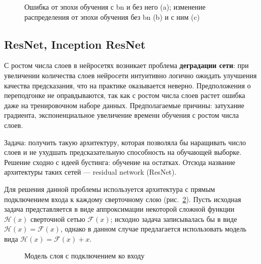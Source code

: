 \documentclass[12pt, specialist, subf, substylefile = spbu.rtx]{disser}
\begin{document}
\begin{figure}[h]
\caption{Ошибка от эпохи обучения с bn и без него (a); изменение распределения от эпохи обучения без bn (b) и с ним (c)}
\label{img:bn}
\end{figure}


\subsection{ResNet, Inception ResNet}

С ростом числа слоев в нейросетях возникает проблема \textbf{деградации сети}: при увеличении количества слоев нейросети интуитивно логично ожидать улучшения качества предсказания, что на практике оказывается неверно. Предположения о переподгонке не оправдываются, так как с ростом числа слоев растет ошибка даже на тренировочном наборе данных. Предполагаемые причины: затухание градиента, экспоненциальное увеличение времени обучения с ростом числа слоев.

Задача: получить такую архитектуру, которая позволяла бы наращивать число слоев и не ухудшать предсказательную способность на обучающей выборке. Решение сходно с идеей бустинга: обучение на остатках. Отсюда название архитектуры таких сетей --- residual network (ResNet).

Для решения данной проблемы используется архитектура с прямым подключением входа к каждому сверточному слою (рис.~\ref{img:resnet}). Пусть исходная задача представляется в виде аппроксимации некоторой сложной функции $\mathcal{H}(x)$ сверточной сетью $\mathcal{F}(x)$; исходно задача записывалась бы в виде $\mathcal{H}(x)=\mathcal{F}(x)$, однако в данном случае предлагается использовать модель вида $\mathcal{H}(x)=\mathcal{F}(x)+x$.

\begin{figure}[h]
\caption{Модель слоя с подключением ко входу}
\label{img:resnet}
\end{figure}
\end{document}
